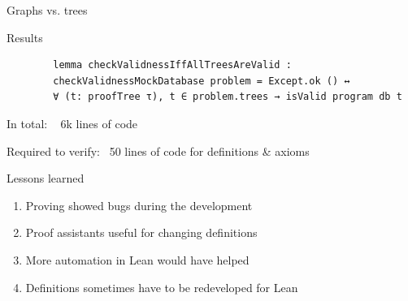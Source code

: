\documentclass{beamer}
\begin{document}
\begin{frame}[fragile]{Graphs vs. trees}
\begin{onlyenv}
{
      }
      
    \end{onlyenv}
  \end{frame}

    \begin{frame}[fragile]{Results}
      \begin{lstlisting}
        lemma checkValidnessIffAllTreesAreValid : 
        checkValidnessMockDatabase problem = Except.ok () ↔   
        ∀ (t: proofTree τ), t ∈ problem.trees → isValid program db t
      \end{lstlisting}

      In total: ~ 6k lines of code 


      Required to verify: ~50 lines of code for definitions \& axioms
    \end{frame}

    \begin{frame}{Lessons learned}
      \begin{enumerate}
        \item Proving showed bugs during the development
        \item Proof assistants useful for changing definitions
        \item More automation in Lean would have helped
        \item Definitions sometimes have to be redeveloped for Lean
      \end{enumerate}
    \end{frame}
\end{document}
